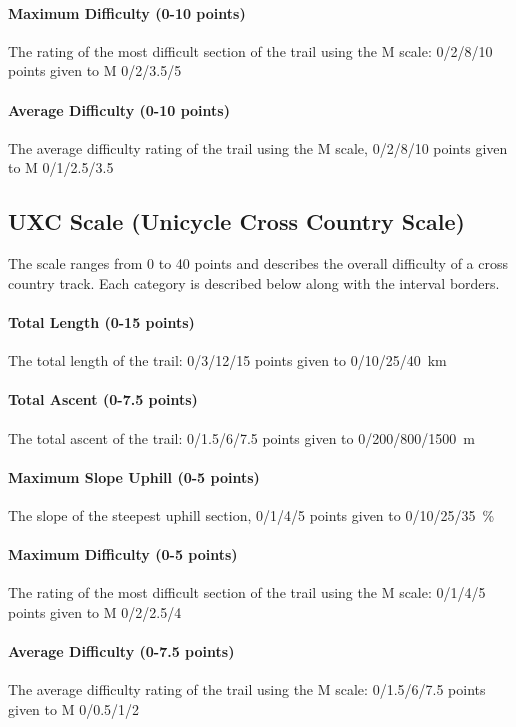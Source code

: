 \documentclass[a4paper,oneside]{scrartcl}
\begin{document}
\paragraph{Maximum Difficulty (0-10 points)}
The rating of the most difficult section of the trail using the M scale:
0/2/8/10 points given to M 0/2/3.5/5

\paragraph{Average Difficulty (0-10 points)}
The average difficulty rating of the trail using the M scale, 0/2/8/10 points
given to M 0/1/2.5/3.5



\subsection{UXC Scale (Unicycle Cross Country Scale)}
\label{sec:uxc-scale}
The scale ranges from 0 to 40 points and describes the overall difficulty of a
cross country track. Each category is described below along with the
interval borders.

\paragraph{Total Length (0-15 points)}
The total length of the trail: 0/3/12/15 points given to 0/10/25/40~km

\paragraph{Total Ascent (0-7.5 points)} 
The total ascent of the trail: 0/1.5/6/7.5 points given to 0/200/800/1500~m

\paragraph{Maximum Slope Uphill (0-5 points)} 
The slope of the steepest uphill section, 0/1/4/5 points given to 0/10/25/35~\%

\paragraph{Maximum Difficulty (0-5 points)}
The rating of the most difficult section of the trail using the M scale: 0/1/4/5
points given to M 0/2/2.5/4

\paragraph{Average Difficulty (0-7.5 points)} 
The average difficulty rating of the trail using the M scale: 0/1.5/6/7.5 points
given to M 0/0.5/1/2
\end{document}
